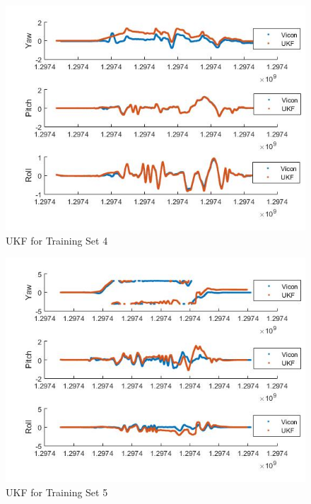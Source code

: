 \documentclass[fleqn,10pt]{SelfArx} %
\begin{document}
\begin{figure}[hbtp]
\centering
\includegraphics[scale=0.45]{4.jpg}
\caption{UKF for Training Set 4}
\label{fig:4}
\end{figure}

\begin{figure}[hbtp]
\centering
\includegraphics[scale=0.45]{5.jpg}
\caption{UKF for Training Set 5}
\label{fig:5}
\end{figure}
\end{document}
